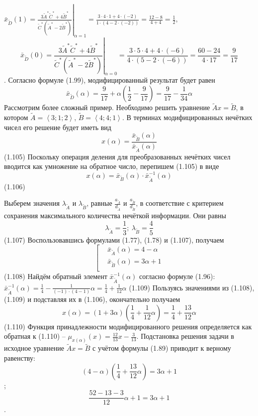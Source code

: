 	${{\bar{x}}_{{\tilde{D}}}}\left( 1 \right)={{\left. \frac{3{{{\tilde{A}}}^{*}}{{{\tilde{C}}}^{*}}+4{{{\tilde{B}}}^{*}}}{{{{\tilde{C}}}^{*}}\left( {{{\tilde{A}}}^{*}}-2{{{\tilde{B}}}^{*}} \right)} \right|}_{\alpha =1}}=\frac{3\cdot 4\cdot 1+4\cdot \left( -2 \right)}{1\cdot \left( 4-2\cdot \left( -2 \right) \right)}=\frac{12-8}{4+4}=\frac{1}{2}$,
	\[{{\bar{x}}_{{\tilde{D}}}}\left( 0 \right)={{\left. \frac{3{{{\tilde{A}}}^{*}}{{{\tilde{C}}}^{*}}+4{{{\tilde{B}}}^{*}}}{{{{\tilde{C}}}^{*}}\left( {{{\tilde{A}}}^{*}}-2{{{\tilde{B}}}^{*}} \right)} \right|}_{\alpha =0}}=\frac{3\cdot 5\cdot 4+4\cdot \left( -6 \right)}{4\cdot \left( 5-2\cdot \left( -6 \right) \right)}=\frac{60-24}{4\cdot 17}=\frac{9}{17}\].
Согласно формуле (1.99), модифицированный результат будет равен
	\[{{\bar{x}}_{{\tilde{D}}}}\left( \alpha  \right)=\frac{9}{17}+\alpha \left( \frac{1}{2}-\frac{9}{17} \right)=\frac{9}{17}-\frac{1}{34}\alpha \] 
Рассмотрим более сложный пример. Необходимо решить уравнение $\tilde{A}x=\tilde{B}$, в котором $\tilde{A}=\left\langle 3;1;2 \right\rangle $, $\tilde{B}=\left\langle 4;4;1 \right\rangle $. В терминах модифицированных нечётких чисел его решение будет иметь вид
	\[x\left( \alpha  \right)=\frac{{{{\bar{x}}}_{{\tilde{B}}}}\left( \alpha  \right)}{{{{\bar{x}}}_{{\tilde{A}}}}\left( \alpha  \right)}\] 	(1.105)
Поскольку операция деления для преобразованных нечётких чисел вводится как умножение на обратное число, перепишем (1.105) в виде
	\[x\left( \alpha  \right)=\bar x_{\tilde B}\left( \alpha  \right)\cdot \bar{x}_{{\tilde{A}}}^{-1}\left( \alpha  \right)\] 	(1.106)

Выберем значения $\lambda_{\tilde A}$ и $\lambda_{\tilde B}$, равные $\frac{a_{\tilde A}}{d_{\tilde A}}$ и $\frac{a_{\tilde B}}{d_{\tilde B}}$, в соответствие с критерием сохранения максимального количества нечёткой информации. Они равны
	\[{{\lambda }_{{\tilde{A}}}}=\frac{1}{3};\ {{\lambda }_{{\tilde{B}}}}=\frac{4}{5}\] 	(1.107)
Воспользовавшись формулами (1.77), (1.78) и (1.107), получаем
	\[\left[ \begin{aligned}
  & {{{\bar{x}}}_{{\tilde{A}}}}\left( \alpha  \right)=4-\alpha  \\ 
 & {{{\bar{x}}}_{{\tilde{B}}}}\left( \alpha  \right)=3\alpha +1 \\ 
\end{aligned} \right.\] 	(1.108)
Найдём обратный элемент $\bar{x}_{{\tilde{A}}}^{-1}\left( \alpha  \right)$ согласно формуле (1.96): 
	$\bar{x}_{{\tilde{A}}}^{-1}\left( \alpha  \right)=\frac{1}{4}-\frac{1}{\left( -1 \right)\cdot \left( 4-1 \right)}\alpha =\frac{1}{4}+\frac{1}{12}\alpha $ 	(1.109)
Пользуясь значениями из (1.108), (1.109) и подставляя их в (1.106), окончательно получаем
	\[x\left( \alpha  \right)=\left( 1+3\alpha  \right)\left( \frac{1}{4}+\frac{1}{12}\alpha  \right)=\frac{1}{4}+\frac{13}{12}\alpha \] 	(1.110)
Функция принадлежности модифицированного решения определяется как обратная к (1.110) – ${{\mu }_{x(\alpha )}}\left( x \right)=\frac{12}{13}x-\frac{3}{13}$. Подстановка решения задачи в исходное уравнение $\tilde{A}x=\tilde{B}$ с учётом формулы (1.89) приводит к верному равенству:
	\[\left( 4-\alpha  \right)\left( \frac{1}{4}+\frac{13}{12}\alpha  \right)=3\alpha +1\];
	\[\frac{52-13-3}{12}\alpha +1=3\alpha +1\].


